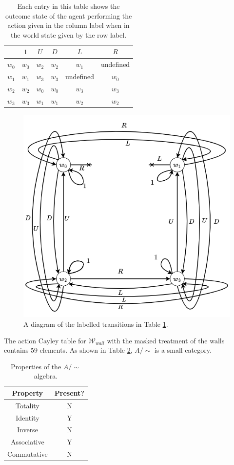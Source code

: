 \begin{table}[H]
    \centering
    \begin{tabular}{c|c c c c c}
                &  $1$      & $U$       & $D$       & $L$               & $R$\\
         \hline
        $w_{0}$ & $w_{0}$   & $w_{2}$   & $w_{2}$   & $w_{1}$           & undefined\\
        $w_{1}$ & $w_{1}$   & $w_{3}$   & $w_{3}$   & undefined         & $w_{0}$\\
        $w_{2}$ & $w_{2}$   & $w_{0}$   & $w_{0}$   & $w_{3}$           & $w_{3}$\\
        $w_{3}$ & $w_{3}$   & $w_{1}$   & $w_{1}$   & $w_{2}$           & $w_{2}$\\
    \end{tabular}
    \caption{Each entry in this table shows the outcome state of the agent performing the action given in the column label when in the world state given by the row label.}
    \label{tab:2x2-gridworld-minimum-transition-wall-masked}
\end{table}

\begin{figure}[H]
    \centering
    \includegraphics[width=0.5\linewidth]{5BeyondSBDRL/Old/Images/restricted-walls-2x2-cyclical-min-actions.drawio.png}
    \caption{
    A diagram of the labelled transitions in Table \ref{tab:2x2-gridworld-minimum-transition-wall-masked}.
    }
    \label{fig:2x2-cyclical-min-actions-wall-masked}
\end{figure}

The action Cayley table for $\mathscr{W}_{wall}$ with the masked treatment of the walls contains 59 elements.
As shown in Table \ref{tab:masked-walls}, $A/\sim$ is a small category.

\begin{table}[H]
    \centering
    \begin{tabular}{c|c}
        \textbf{Property}   & \textbf{Present?} \\
        \hline
        Totality            & N\\
        Identity            & Y\\
        Inverse             & N\\
        Associative         & Y\\
        Commutative         & N
    \end{tabular}
    \caption{Properties of the $A/\sim$ algebra.}
    \label{tab:masked-walls}
\end{table}

